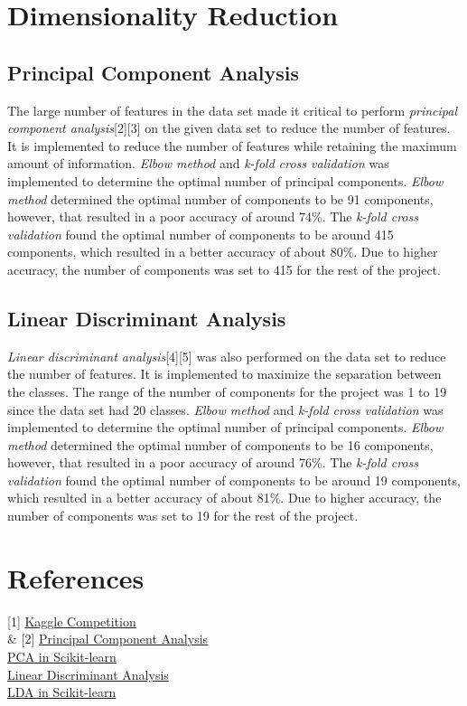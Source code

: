 \documentclass[conference]{IEEEtran}
\begin{document}
\section{Dimensionality Reduction}
\subsection{Principal Component Analysis}
    The large number of features in the data set made it critical to perform \textit{principal component analysis}[2][3] on the given data set to reduce the number of features. It is implemented to reduce the number of features while retaining the maximum amount of information. \textit{Elbow method} and \textit{k-fold cross validation} was implemented to determine the optimal number of principal components. \textit{Elbow method} determined the optimal number of components to be 91 components, however, that resulted in a poor accuracy of around 74\%. 
    The \textit{k-fold cross validation} found the optimal number of components to be around 415 components, which resulted in a better accuracy of about 80\%.
    Due to higher accuracy, the number of components was set to 415 for the rest of the project.
\subsection{Linear Discriminant Analysis}
    \textit{Linear discriminant analysis}[4][5] was also performed on the data set to reduce the number of features. It is implemented to maximize the separation between the classes. The range of the number of components for the project was 1 to 19 since the data set had 20 classes. \textit{Elbow method} and \textit{k-fold cross validation} was implemented to determine the optimal number of principal components. \textit{Elbow method} determined the optimal number of components to be 16 components, however, that resulted in a poor accuracy of around 76\%. 
    The \textit{k-fold cross validation} found the optimal number of components to be around 19 components, which resulted in a better accuracy of about 81\%.
    Due to higher accuracy, the number of components was set to 19 for the rest of the project.

\section{References}
    [1] \href{https://www.kaggle.com/competitions/sml-project/overview}{Kaggle Competition} \\ \relax
    & [2] \href{https://en.wikipedia.org/wiki/Principal_component_analysis}{Principal Component Analysis} \\ \relax
    [3] \href{https://scikit-learn.org/stable/modules/generated/sklearn.decomposition.PCA.html}{PCA in Scikit-learn} \\ \relax
    [4] \href{https://en.wikipedia.org/wiki/Linear_discriminant_analysis}{Linear Discriminant Analysis} \\ \relax
    [5] \href{https://scikit-learn.org/stable/modules/generated/sklearn.discriminant_analysis.LinearDiscriminantAnalysis.html}{LDA in Scikit-learn} \\ \relax
\end{document}
